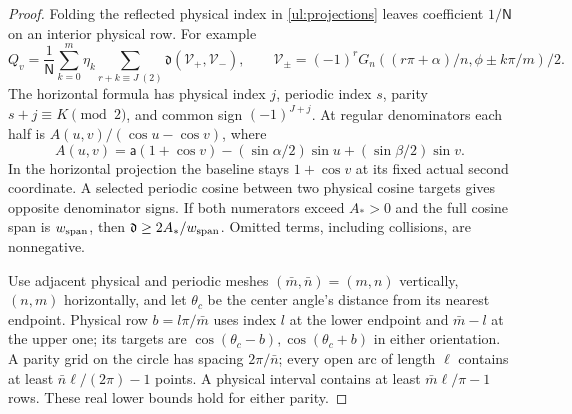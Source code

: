 \begin{proof}
Folding the reflected physical index in \eqref{ul:projections} leaves
coefficient $1/\mathsf N$ on an interior physical row.  For example
\[
 Q_v=\frac1{\mathsf N}\sum_{k=0}^m\eta_k
  \sum_{r+k\equiv J\ (2)}\mathfrak d(\mathcal V_+,\mathcal V_-),\qquad
 \mathcal V_\pm=(-1)^rG_n((r\pi+\alpha)/n,\phi\pm k\pi/m)/2.
\]
The horizontal formula has physical index $j$, periodic index $s$,
parity $s+j\equiv K\pmod2$, and common sign $(-1)^{J+j}$.
At regular denominators each half is $A(u,v)/(\cos u-\cos v)$, where
\[
 A(u,v)=\mathsf{a}(1+\cos v)-(\sin\alpha/2)\sin u+(\sin\beta/2)\sin v.
\]
In the horizontal projection the baseline stays $1+\cos v$ at its
fixed actual second coordinate.  A selected periodic cosine between
two physical cosine targets gives opposite denominator signs.  If both
numerators exceed $A_*>0$ and the full cosine span is $w_{\rm span}$, then
$\mathfrak d\geq2A_*/w_{\rm span}$.  Omitted terms, including collisions, are nonnegative.

Use adjacent physical and periodic meshes $(\bar{m},\bar{n})=(m,n)$ vertically,
$(n,m)$ horizontally, and let $\theta_c$ be the center angle's distance
from its nearest endpoint.  Physical row $b=l\pi/\bar{m}$ uses index $l$
at the lower endpoint and $\bar{m}-l$ at the upper one; its targets are
$\cos(\theta_c-b),\cos(\theta_c+b)$ in either orientation.  A parity grid
on the circle has spacing $2\pi/\bar{n}$; every open arc of length $\ell$
contains at least $\bar{n}\ell/(2\pi)-1$ points.  A physical interval contains
at least $\bar{m}\ell/\pi-1$ rows.  These real lower bounds hold for either parity.


\end{proof}
